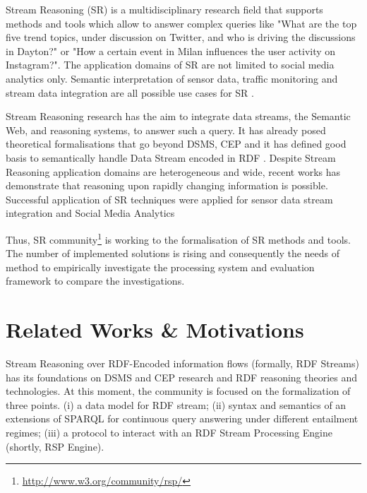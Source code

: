 Stream Reasoning (SR) is a multidisciplinary research field that supports methods and tools which allow to answer complex queries like "What are the top five trend topics, under discussion on Twitter, and who is driving the discussions in Dayton?" or "How a certain event in Milan influences the user activity on Instagram?". The application domains of SR are not limited to social media analytics only. Semantic interpretation of sensor data, traffic monitoring and stream data integration are all possible use cases for SR \cite{DBLP:journals/expert/ValleCHF09}.

Stream Reasoning research has the aim to integrate data streams, the Semantic Web, and reasoning systems, to answer such a query. It has already posed theoretical formalisations that go beyond DSMS, CEP  \cite{DBLP:conf/debs/KomazecCF12, Lephuoc2011, 4618773} and it has defined good basis to semantically handle Data Stream encoded in RDF \cite{DBLP:conf/fis/ValleCBBC08, DBLP:journals/sigmod/BarbieriBCVG10}. Despite Stream Reasoning application domains are heterogeneous and wide, recent works has demonstrate that reasoning upon rapidly changing information is possible. Successful application of SR techniques were applied for sensor data stream integration \cite{DBLP:journals/ijswis/CalbimonteJCA12,DBLP:journals/ws/LecueTHTBST14}  and Social Media Analytics \cite{DBLP:journals/ws/BalduiniCDVHLKT12}

Thus, SR community\footnote{\url{http://www.w3.org/community/rsp/}} is working to the formalisation of SR methods and tools. The number of implemented solutions is rising and consequently the needs of method to empirically investigate the processing system and evaluation framework to compare the investigations.


\section{Related Works \& Motivations}\label{sec:motivations-intro}

Stream Reasoning over RDF-Encoded information flows (formally, RDF Streams) has its foundations on DSMS and CEP research and RDF reasoning theories and technologies. At this moment, the community is focused on the formalization of three points.  (i) a data model for RDF stream; (ii) syntax and semantics of an extensions of SPARQL for continuous query answering under different entailment regimes; (iii) a protocol to interact with an RDF Stream Processing Engine (shortly, RSP Engine). 

